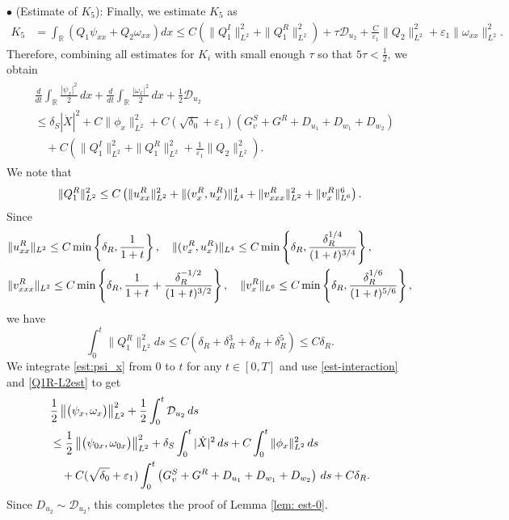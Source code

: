 \documentclass[11pt,reqno]{amsart}
\begin{document}
\begin{appendix}
\noindent $\bullet$ (Estimate of $K_5$): Finally, we estimate $K_5$ as
\begin{align*}
K_5&=\int_\mathbb{R} (Q_1 \psi_{xx} + Q_2 \omega_{xx}) dx \le C(\|Q_1^I\|_{L^2}^2 + \|Q_1^R\|_{L^2}^2 ) + \tau \mathcal{D}_{u_2} + \frac{C}{\varepsilon_1} \|Q_2\|_{L^2}^2 + \varepsilon_1 \|\omega_{xx}\|_{L^2}^2.
\end{align*}
Therefore, combining all estimates for $K_i$ with small enough $\tau$ so that $5\tau<\frac{1}{2}$, we obtain
\begin{align}
\begin{aligned}\label{est:psi_x}
&\frac{d}{dt}\int_{\mathbb{R}} \frac{|\psi_x|^2}{2} \,dx+\frac{d}{dt}\int_{\mathbb{R}} \frac{|\omega_x|^2}{2} \,dx + \frac{1}{2} \mathcal{D}_{u_2} \\ 
&\le \delta_S |\dot{X}|^2 +C \| \phi_x\|_{L^2}^2+C (\sqrt{\delta_0} +\varepsilon_1)  \left( G^S_v+G^R+D_{u_1} + D_{w_1} + D_{w_2} \right) \\
&\quad + C\left(\|Q_1^I\|_{L^2}^2 + \|Q_1^R\|_{L^2}^2+ \frac{1}{\varepsilon_1}\|Q_2\|_{L^2}^2\right).
\end{aligned}
\end{align}
We note that
\[\|Q_1^R\|_{L^2}^2 \le C \left( \|u^R_{xx}\|_{L^2}^2 +\|(v^R_x,u^R_x)\|_{L^4}^4 +\|v^R_{xxx}\|_{L^2}^2+ \|v^R_x\|_{L^6}^6 \right).\]
Since 
\begin{align*}
&\|u^R_{xx}\|_{L^2} \le C \min \left\{  \delta_R, \frac{1}{1+t} \right\}, \quad  \|(v^R_{x},u^R_{x})\|_{L^4} \le C \min \left\{  \delta_R, \frac{\delta_R^{1/4}}{(1+t)^{3/4}} \right\}, \\
&\|v^R_{xxx}\|_{L^2} \le C \min \left\{  \delta_R, \frac{1}{1+t}+\frac{\delta_R^{-1/2}}{(1+t)^{3/2}} \right\}, \quad  \|v^R_{x}\|_{L^6} \le C \min \left\{  \delta_R, \frac{\delta_R^{1/6}}{(1+t)^{5/6}} \right\},
\end{align*}
we have
\begin{equation} \label{Q1R-L2est}
\int_0^t \|Q_1^R\|_{L^2}^2 ds \le C  \left( \delta_R + \delta_R^3 +\delta_R +\delta_R^5\right) \le C \delta_R.   
\end{equation}	
We integrate \eqref{est:psi_x} from $0$ to $t$ for any $t\in \left[0, T  \right]$ and use \eqref{est-interaction} and \eqref{Q1R-L2est} to get
\begin{align*}
&\frac{1}{2}\left\lVert \big(\psi_x, \omega_x \big)\right\rVert_{L^2}^2+ \frac{1}{2} \int_0^t \mathcal{D}_{u_2} \, d s \\
&\le \frac{1}{2} \left\lVert \big(\psi_{0x}, \omega_{0x} \big)\right\rVert_{L^2}^2+\delta_S \int_0^t |\dot{X}|^2 \, d s + C \int_0^t \| \phi_x\|_{L^2}^2 \, d s \\ 
& \quad +C (\sqrt{\delta_0} +\varepsilon_1) \int_0^t  \left( G^S_v+G^R + D_{u_1}+D_{w_1} + D_{w_2} \right) \, d s  +C \delta_R.
\end{align*}
Since $D_{u_2} \sim \mathcal{D}_{u_2}$, this completes the proof of Lemma \ref{lem: est-0}.


\end{appendix}
\end{document}
